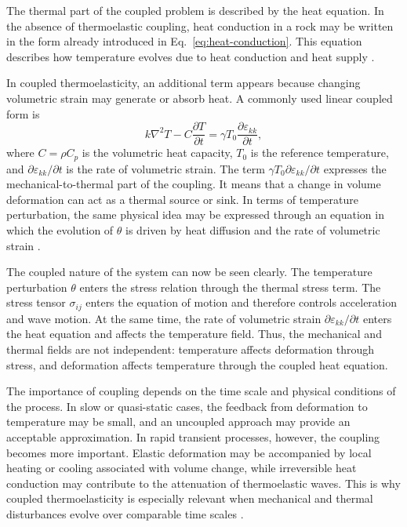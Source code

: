 The thermal part of the coupled problem is described by the heat equation. In the absence of thermoelastic coupling, heat conduction in a rock may be written in the form already introduced in Eq.~\eqref{eq:heat-conduction}. This equation describes how temperature evolves due to heat conduction and heat supply \cite{robertson1988,turcotte2014}.

In coupled thermoelasticity, an additional term appears because changing volumetric strain may generate or absorb heat. A commonly used linear coupled form is
\begin{equation}
\label{eq:coupled-heat}
k \nabla^2 T
-
C \frac{\partial T}{\partial t}
=
\gamma T_0
\frac{\partial \varepsilon_{kk}}{\partial t},
\end{equation}
where \(C = \rho C_p\) is the volumetric heat capacity, \(T_0\) is the reference temperature, and \(\partial \varepsilon_{kk}/\partial t\) is the rate of volumetric strain. The term
\(\gamma T_0 \partial \varepsilon_{kk}/\partial t\)
expresses the mechanical-to-thermal part of the coupling. It means that a change in volume deformation can act as a thermal source or sink. In terms of temperature perturbation, the same physical idea may be expressed through an equation in which the evolution of \(\theta\) is driven by heat diffusion and the rate of volumetric strain \cite{nowacki1986,boley1960}.

The coupled nature of the system can now be seen clearly. The temperature perturbation \(\theta\) enters the stress relation through the thermal stress term. The stress tensor \(\sigma_{ij}\) enters the equation of motion and therefore controls acceleration and wave motion. At the same time, the rate of volumetric strain \(\partial \varepsilon_{kk}/\partial t\) enters the heat equation and affects the temperature field. Thus, the mechanical and thermal fields are not independent: temperature affects deformation through stress, and deformation affects temperature through the coupled heat equation.

The importance of coupling depends on the time scale and physical conditions of the process. In slow or quasi-static cases, the feedback from deformation to temperature may be small, and an uncoupled approach may provide an acceptable approximation. In rapid transient processes, however, the coupling becomes more important. Elastic deformation may be accompanied by local heating or cooling associated with volume change, while irreversible heat conduction may contribute to the attenuation of thermoelastic waves. This is why coupled thermoelasticity is especially relevant when mechanical and thermal disturbances evolve over comparable time scales \cite{boley1960,nowacki1986}.

